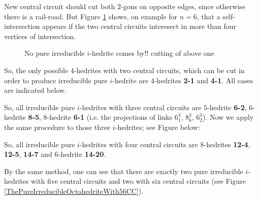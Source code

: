 \documentclass[12pt]{article}
\begin{document}
New central circuit should cut both $2$-gons on opposite edges, since otherwise there is a rail-road. But Figure \ref{Cutting4hedrite} shows, on example for $n=6$, that a self-intersection appears if the two central circuits interesect in more than four vertices of intersection.


\begin{figure}
\centering
\epsfxsize=40mm
\caption{No pure irreducible $i$-hedrite comes by!! cutting of above one}
\label{Cutting4hedrite}
\end{figure}



So, the only possible $4$-hedrites with two central circuits, which can
be cut in order to produce irreducible pure $i$-hedrite
are $4$-hedrites {\bf 2-1} and {\bf 4-1}. All cases are indicated below. 

\begin{center}
\epsfxsize=120mm
\end{center}

So, all irreducible pure $i$-hedrites with three central circuits are $5$-hedrite {\bf 6-2}, $6$-hedrite {\bf 8-5}, $8$-hedrite {\bf 6-1} (i.e. the projections of links $6^3_1$, $8^3_6$, $6^3_2$).
Now we apply the same procedure to those three $i$-hedrites; see Figure below:

\begin{center}
\epsfxsize=120mm
\end{center}

So, all irreducible pure $i$-hedrites with four central circuits are $8$-hedrites {\bf 12-4}, {\bf 12-5}, {\bf 14-7} and $6$-hedrite {\bf 14-20}.

By the same method, one can see that there are exactly two pure irreducible $i$-hedrites with five central circuits and two with six central circuits (see Figure \ref{ThePureIrreducibleOctahedriteWith56CC}).
\end{document}
